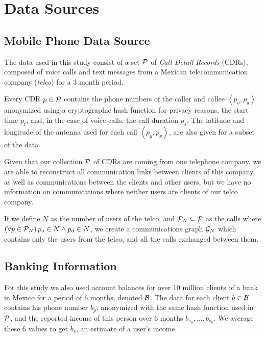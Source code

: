 \section{Data Sources}\label{data_sources}

\subsection{Mobile Phone Data Source}

The data used in this study consist of a set \( \mathcal{P} \) of \textit{Call Detail Records} (CDRs), composed of voice calls and text messages from a Mexican telecommunication company (\textit{telco}) for a 3 month period.

Every CDR \( p \in \mathcal{P} \) contains the phone numbers of the caller and callee \( \left< p_o, p_d \right> \) anonymized using a cryptographic hash function for privacy reasons, the start time \( p_t \), and, in the case of voice calls, the call duration \( p_s \). The latitude and longitude of the antenna used for each call \( \left< p_y, p_x \right> \), are also given for a subset of the data.

Given that our collection \( \mathcal{P} \) of CDRs are coming from one telephone company, we are able to reconstruct all communication links between clients of this company, as well as communications between the clients and other users, but we have no information on communications where neither users are clients of our telco company.

If we define \( N \) as the number of users of the telco, and \( \mathcal{P}_N \subseteq \mathcal{P} \) as the calls where \( \left( \forall p \in \mathcal{P}_N \right) p_o \in N \wedge p_d \in N \), we create a communications graph \( \mathcal{G}_N \) which contains only the users from the telco, and all the calls exchanged between them.


\subsection{Banking Information}

For this study we also used account balances for over 10 million clients of a bank in Mexico for a period of 6 months, denoted \( \mathcal{B} \). The data for each client \( b \in \mathcal{B} \) contains his phone number \( b_p \), anonymized with the same hash function used in \( \mathcal{P} \), and the reported income of this person over 6 months \( b_{s_0}, \ldots, b_{s_5} \). We average these 6 values to get \( b_s \), an estimate of a user's income.

